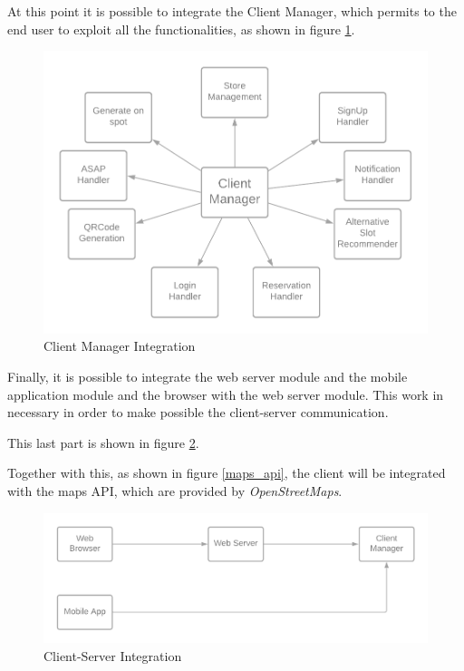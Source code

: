 \documentclass[table, 12pt]{article}
\begin{document}
At this point it is possible to integrate the Client Manager, which permits to the end user to exploit all the functionalities, as shown in figure \ref{client_manager}.

\begin{center}
    \begin{figure}[H]
        \includegraphics[width=\textwidth]{assets/IT-Plan/ClientManager.png}
        \caption{Client Manager Integration}
        \label{client_manager}
    \end{figure}
\end{center}

Finally, it is possible to integrate the web server module and the mobile application module and the browser with the web server module. This work in necessary in order to make possible the client-server communication.

This last part is shown in figure \ref{client_server_integration}.

Together with this, as shown in figure \ref{maps_api}, the client will be integrated with the maps API, which are provided by \textit{OpenStreetMaps}.

\begin{center}
    \begin{figure}[H]
        \includegraphics[width=\textwidth]{assets/IT-Plan/ClientServerIntegration.png}
        \caption{Client-Server Integration}
        \label{client_server_integration}
    \end{figure}
\end{center}
\end{document}
